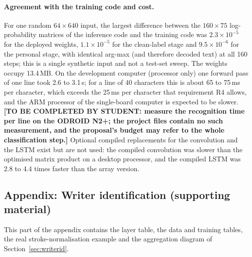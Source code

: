 \paragraph{Agreement with the training code and cost.}
For one random $64\times640$ input, the largest difference between the $160\times75$ log-probability matrices of the inference code and the training code was $2.3\times10^{-5}$ for the deployed weights, $1.1\times10^{-5}$ for the clean-label stage and $9.5\times10^{-6}$ for the personal stage, with identical arg-max (and therefore decoded text) at all 160 steps; this is a single synthetic input and not a test-set sweep.
The weights occupy 13.4\,MB.
On the development computer (processor only) one forward pass of one line took 2.6 to 3.1\,s; for a line of 40 characters this is about 65 to 75\,ms per character, which exceeds the 25\,ms per character that requirement R4 allows, and the ARM processor of the single-board computer is expected to be slower.
\textbf{[TO BE COMPLETED BY STUDENT: measure the recognition time per line on the ODROID N2+; the project files contain no such measurement, and the proposal's budget may refer to the whole classification step.]}
Optional compiled replacements for the convolution and the LSTM exist but are not used: the compiled convolution was slower than the optimised matrix product on a desktop processor, and the compiled LSTM was 2.8 to 4.4 times faster than the array version.



\subsection{Appendix: Writer identification (supporting material)}

This part of the appendix contains the layer table, the data and training tables, the real stroke-normalisation example and the aggregation diagram of Section~\ref{sec:writerid}.

